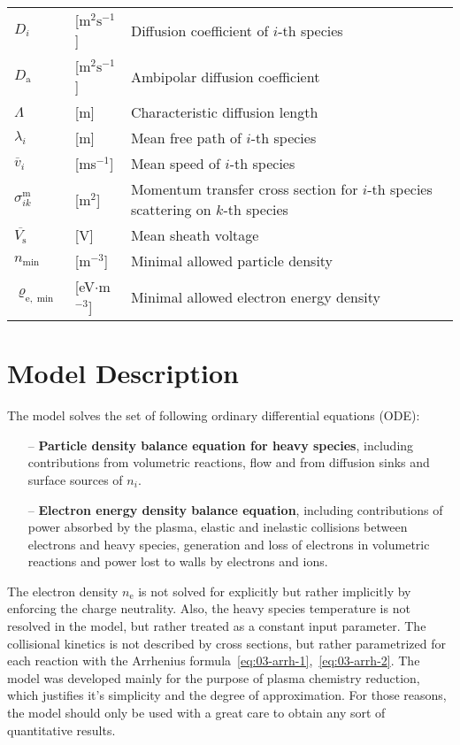 \begin{longtable}[H]{L{16mm}R{25mm}L{94mm}}
    $D_{i}$ & [m$^{2}\mathrm{s}^{-1}$] & Diffusion coefficient of $i$-th species \\
    $D_{\mathrm{a}}$ & [m$^{2}\mathrm{s}^{-1}$] & Ambipolar diffusion coefficient \\
    $\Lambda$ & [m] & Characteristic diffusion length \\
    $\lambda_{i}$ & [m] & Mean free path of $i$-th species \\
    $\overline{v}_{i}$ & [ms$^{-1}$] & Mean speed of $i$-th species \\
    $\sigma^{\mathrm{m}}_{ik}$ & [m$^{2}$] & Momentum transfer cross section for $i$-th species scattering on
                                             $k$-th species \\
    $\overline{V_{\mathrm{s}}}$ & [V] & Mean sheath voltage \\
    $n_{\min}$ & [m$^{-3}$] & Minimal allowed particle density \\
    $\varrho_{\mathrm{e}, \min}$ & [eV$\cdot$m$^{-3}$] & Minimal allowed electron energy density \\
    \hline
    \hline
\end{longtable}

\section{Model Description}
The model solves the set of following ordinary differential equations (ODE):
\begin{itemize}
    \item[--]
    \textbf{Particle density balance equation for heavy species}, including contributions from volumetric reactions,
    flow and from diffusion sinks and surface sources of $ n_{i} $.
    \item[--]
    \textbf{Electron energy density balance equation}, including contributions of power absorbed by the plasma,
    elastic and inelastic collisions between electrons and heavy species, generation and loss of electrons in
    volumetric reactions and power lost to walls by electrons and ions.
\end{itemize}

The electron density $n_{\mathrm{e}}$ is not solved for explicitly but rather implicitly by enforcing the charge
neutrality.
Also, the heavy species temperature is not resolved in the model, but rather treated as a constant input parameter.
The collisional kinetics is not described by cross sections, but rather parametrized for each reaction with the
Arrhenius formula~\eqref{eq:03-arrh-1},~\eqref{eq:03-arrh-2}.
The model was developed mainly for the purpose of plasma chemistry reduction, which justifies it's simplicity and the
degree of approximation.
For those reasons, the model should only be used with a great care to obtain any sort of quantitative results.

